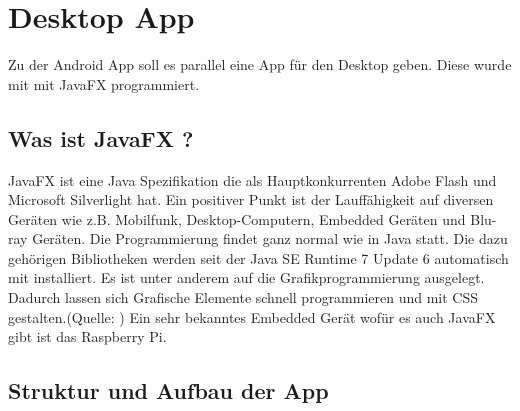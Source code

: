 
\chapter{Desktop App}
Zu der Android App soll es parallel eine App für den Desktop geben. Diese wurde mit mit JavaFX programmiert.
\section{Was ist JavaFX ?}
JavaFX ist eine Java Spezifikation die als Hauptkonkurrenten Adobe Flash und Microsoft Silverlight hat. Ein positiver Punkt ist der Lauffähigkeit auf diversen Geräten wie z.B. Mobilfunk, Desktop-Computern, Embedded Geräten und Blu-ray Geräten. Die Programmierung findet ganz normal wie in Java statt. Die dazu gehörigen Bibliotheken werden seit der Java SE Runtime 7 Update 6 automatisch mit installiert. Es ist unter anderem auf die Grafikprogrammierung ausgelegt. Dadurch lassen sich Grafische Elemente schnell programmieren und mit CSS gestalten.(Quelle: \cite{bib.jFXRaspPi})\newline
Ein sehr bekanntes Embedded Gerät wofür es auch JavaFX gibt ist das Raspberry Pi.
\section{Struktur und Aufbau der App}
